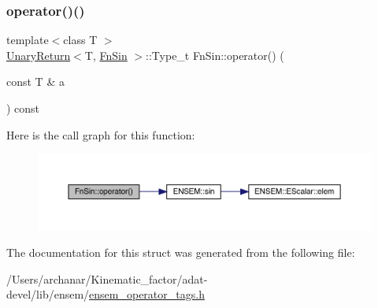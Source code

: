 \subsubsection{\texorpdfstring{operator()()}{operator()()}\hspace{0.1cm}{\footnotesize\ttfamily [3/3]}}
{\footnotesize\ttfamily template$<$class T $>$ \\
\mbox{\hyperlink{structUnaryReturn}{Unary\+Return}}$<$T, \mbox{\hyperlink{structFnSin}{Fn\+Sin}} $>$\+::Type\+\_\+t Fn\+Sin\+::operator() (\begin{DoxyParamCaption}\item[{const T \&}]{a }\end{DoxyParamCaption}) const\hspace{0.3cm}{\ttfamily [inline]}}

Here is the call graph for this function\+:
\nopagebreak
\begin{figure}[H]
\begin{center}
\leavevmode
\includegraphics[width=350pt]{d6/d10/structFnSin_a6aa1709fd8bbba5ccb5a3cba4c5ad601_cgraph}
\end{center}
\end{figure}


The documentation for this struct was generated from the following file\+:\begin{DoxyCompactItemize}
\item 
/\+Users/archanar/\+Kinematic\+\_\+factor/adat-\/devel/lib/ensem/\mbox{\hyperlink{adat-devel_2lib_2ensem_2ensem__operator__tags_8h}{ensem\+\_\+operator\+\_\+tags.\+h}}\end{DoxyCompactItemize}
